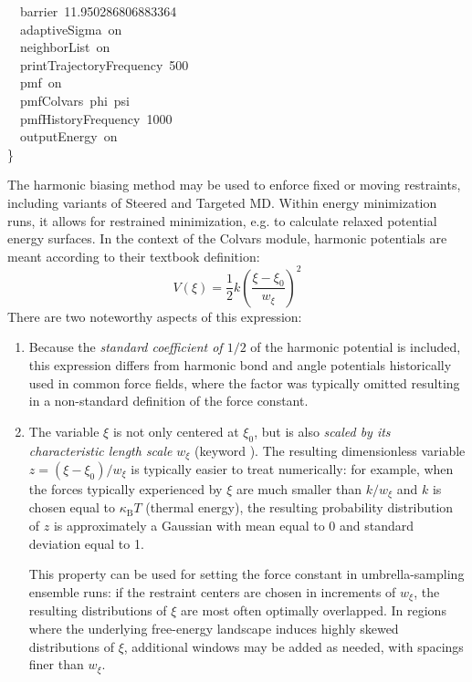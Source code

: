 \begin{cvexampleinput}
\-~~barrier~11.950286806883364        \\
\-~~adaptiveSigma~on                  \\
\-~~neighborList~on                   \\
\-~~printTrajectoryFrequency~500      \\
\-~~pmf~on                            \\
\-~~pmfColvars~phi~psi                \\
\-~~pmfHistoryFrequency~1000          \\
\-~~outputEnergy~on                   \\
\-\}
\end{cvexampleinput}



The harmonic biasing method may be used to enforce fixed or moving restraints,
including variants of Steered and Targeted MD. Within energy minimization
runs, it allows for restrained minimization, e.g. to calculate relaxed potential
energy surfaces. In the context of the Colvars module,
harmonic potentials are meant according to their textbook definition:
\begin{equation}
  \label{eq:colvarbias_harmonic}
  V\left(\xi\right) = \frac{1}{2} k \left(\frac{\xi - \xi_0}{w_{\xi}}\right)^2
\end{equation}
There are two noteworthy aspects of this expression:
\begin{enumerate}
\item Because the \emph{standard coefficient of $1/2$} of the harmonic potential is included, this expression differs from harmonic bond and angle potentials historically used in common force fields, where the factor was typically omitted resulting in a non-standard definition of the force constant.
\item The variable $\xi$ is not only centered at $\xi_0$, but is also \emph{scaled by its characteristic length scale} $w_{\xi}$ (keyword ).
  The resulting dimensionless variable $z = (\xi - \xi_0)/w_{\xi}$ is typically easier to treat numerically: for example, when the forces typically experienced by $\xi$ are much smaller than $k/w_{\xi}$ and $k$ is chosen equal to $\kappa_{\mathrm{B}}T$ (thermal energy), the resulting probability distribution of $z$ is approximately a Gaussian with mean equal to 0 and standard deviation equal to 1.

  This property can be used for setting the force constant in umbrella-sampling ensemble runs: if the restraint centers are chosen in increments of $w_{\xi}$, the resulting distributions of $\xi$ are most often optimally overlapped.
  In regions where the underlying free-energy landscape induces highly skewed distributions of $\xi$, additional windows may be added as needed, with spacings finer than $w_{\xi}$.
\end{enumerate}

